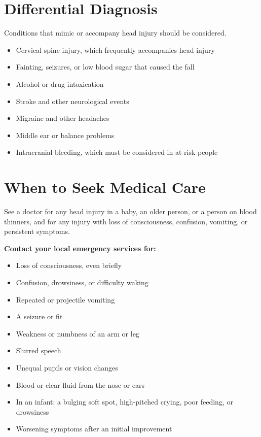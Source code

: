 \section*{Differential Diagnosis}
Conditions that mimic or accompany head injury should be considered.

\begin{itemize}
    \item Cervical spine injury, which frequently accompanies head injury
    \item Fainting, seizures, or low blood sugar that caused the fall
    \item Alcohol or drug intoxication
    \item Stroke and other neurological events
    \item Migraine and other headaches
    \item Middle ear or balance problems
    \item Intracranial bleeding, which must be considered in at-risk people
\end{itemize}

\section*{When to Seek Medical Care}
See a doctor for any head injury in a baby, an older person, or a person on blood thinners, and for any injury with loss of consciousness, confusion, vomiting, or persistent symptoms.

\textbf{Contact your local emergency services for:}
\begin{itemize}
    \item Loss of consciousness, even briefly
    \item Confusion, drowsiness, or difficulty waking
    \item Repeated or projectile vomiting
    \item A seizure or fit
    \item Weakness or numbness of an arm or leg
    \item Slurred speech
    \item Unequal pupils or vision changes
    \item Blood or clear fluid from the nose or ears
    \item In an infant: a bulging soft spot, high-pitched crying, poor feeding, or drowsiness
    \item Worsening symptoms after an initial improvement
\end{itemize}


